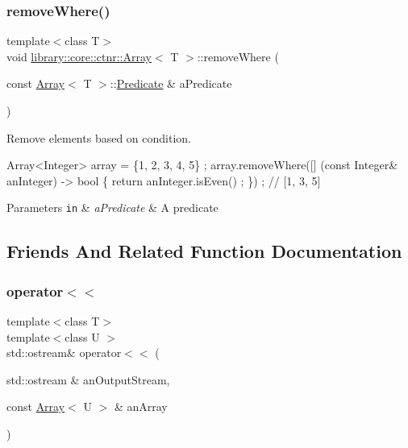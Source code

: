 \subsubsection{\texorpdfstring{remove\+Where()}{removeWhere()}}
{\footnotesize\ttfamily template$<$class T$>$ \\
void \hyperlink{classlibrary_1_1core_1_1ctnr_1_1Array}{library\+::core\+::ctnr\+::\+Array}$<$ T $>$\+::remove\+Where (\begin{DoxyParamCaption}\item[{const \hyperlink{classlibrary_1_1core_1_1ctnr_1_1Array}{Array}$<$ T $>$\+::\hyperlink{classlibrary_1_1core_1_1ctnr_1_1Array_a74cd325a740870aea490b6b739aa06ae}{Predicate} \&}]{a\+Predicate }\end{DoxyParamCaption})}



Remove elements based on condition. 


\begin{DoxyCode}
Array<Integer> array = \{1, 2, 3, 4, 5\} ;
array.removeWhere([] (\textcolor{keyword}{const} Integer& anInteger) -> \textcolor{keywordtype}{bool} \{ \textcolor{keywordflow}{return} anInteger.isEven() ; \}) ; \textcolor{comment}{// [1, 3, 5]}
\end{DoxyCode}



\begin{DoxyParams}[1]{Parameters}
\mbox{\tt in}  & {\em a\+Predicate} & A predicate \\
\hline
\end{DoxyParams}


\subsection{Friends And Related Function Documentation}
\mbox{\label{classlibrary_1_1core_1_1ctnr_1_1Array_a9daa2d638e5bd693776f8bf6caae0802}} 
\subsubsection{\texorpdfstring{operator$<$$<$}{operator<<}}
{\footnotesize\ttfamily template$<$class T$>$ \\
template$<$class U $>$ \\
std\+::ostream\& operator$<$$<$ (\begin{DoxyParamCaption}\item[{std\+::ostream \&}]{an\+Output\+Stream,  }\item[{const \hyperlink{classlibrary_1_1core_1_1ctnr_1_1Array}{Array}$<$ U $>$ \&}]{an\+Array }\end{DoxyParamCaption})\hspace{0.3cm}{\ttfamily [friend]}}



